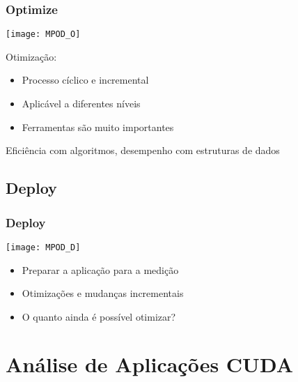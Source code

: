 \documentclass[10pt, compress]{beamer}
\begin{document}
\begin{frame}
    \frametitle{Optimize}
    \begin{center}
    \texttt{[image: MPOD\_O]}
    \end{center}

    \vfill

    Otimização:
    \begin{itemize}
        \item Processo \alert{cíclico} e \alert{incremental}
        \item Aplicável a \alert{diferentes níveis}
        \item \alert{Ferramentas} são muito importantes
    \end{itemize}

    \begin{center}
    \alert{Eficiência com algoritmos}, \alert{desempenho com estruturas de dados}
    \end{center}
\end{frame}

\subsection{Deploy}

\begin{frame}
    \frametitle{Deploy}
    \begin{center}
    \texttt{[image: MPOD\_D]}
    \end{center}

    \vfill

    \begin{itemize}
        \item Preparar a aplicação para a \alert{medição}
        \item Otimizações e mudanças \alert{incrementais}
        \item O quanto ainda é \alert{possível} otimizar?
    \end{itemize}
\end{frame}

\section{Análise de Aplicações CUDA}
\end{document}

